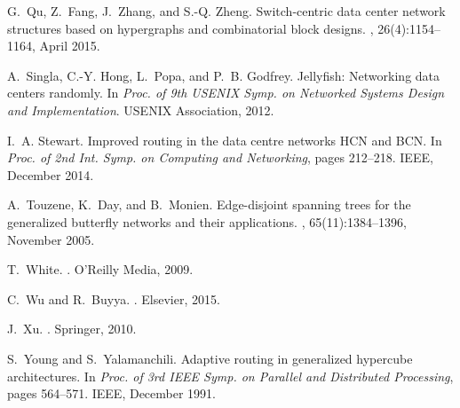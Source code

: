 \documentclass[]{amsart}
\begin{document}
\begin{thebibliography}{10}
G.~Qu, Z.~Fang, J.~Zhang, and S.-Q. Zheng.
\newblock Switch-centric data center network structures based on hypergraphs
  and combinatorial block designs.
,
  26(4):1154--1164, April 2015.

A.~Singla, C.-Y. Hong, L.~Popa, and P.~B. Godfrey.
\newblock Jellyfish: Networking data centers randomly.
\newblock In {\em Proc. of 9th USENIX Symp. on Networked Systems Design and
  Implementation}. USENIX Association, 2012.

I.~A. Stewart.
\newblock Improved routing in the data centre networks {HCN} and {BCN}.
\newblock In {\em Proc. of 2nd Int. Symp. on Computing and Networking}, pages
  212--218. IEEE, December 2014.

A.~Touzene, K.~Day, and B.~Monien.
\newblock Edge-disjoint spanning trees for the generalized butterfly networks
  and their applications.
,
  65(11):1384--1396, November 2005.

T.~White.
.
\newblock O'Reilly Media, 2009.

C.~Wu and R.~Buyya.
.
\newblock Elsevier, 2015.

J.~Xu.
.
\newblock Springer, 2010.

S.~Young and S.~Yalamanchili.
\newblock Adaptive routing in generalized hypercube architectures.
\newblock In {\em Proc. of 3rd IEEE Symp. on Parallel and Distributed
  Processing}, pages 564--571. IEEE, December 1991.

\end{thebibliography}
\end{document}
